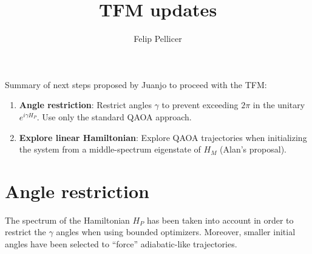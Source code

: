\documentclass[12pt, letterpaper]{article}
\title{TFM updates}
\author{Felip Pellicer}
\begin{document}
\maketitle

\noindent Summary of next steps proposed by Juanjo to proceed with the TFM:
\begin{enumerate}
    \item \textbf{Angle restriction}: Restrict angles $\gamma$ to prevent exceeding $2\pi$
    in the unitary $e^{i \gamma H_P}$. Use only the standard QAOA approach.
    \item \textbf{Explore linear Hamiltonian}: Explore QAOA trajectories when initializing the
    system from a middle-spectrum eigenstate of $H_M$ (Alan's proposal).
    
\end{enumerate}

\section{Angle restriction}
The spectrum of the Hamiltonian $H_P$ has been taken into account in order to restrict the
$\gamma$ angles when using bounded optimizers. Moreover, smaller initial angles have been
selected to ``force'' adiabatic-like trajectories.
\end{document}
